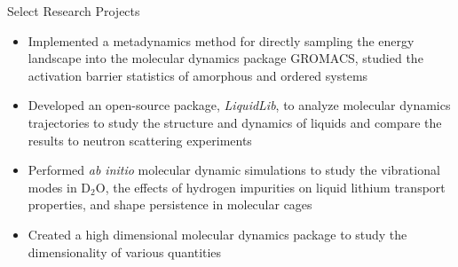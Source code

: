 \documentclass[9pt]{resume} %
\begin{document}
\begin{rSection}{Select Research Projects}
	\begin{itemize}\setlength\itemsep{-3pt}
		\item Implemented a metadynamics method for directly sampling the energy landscape into the molecular dynamics package GROMACS, studied the activation barrier statistics of amorphous and ordered systems
		\item Developed an open-source package, \textit{LiquidLib}, to analyze molecular dynamics trajectories to study the structure and dynamics of liquids and compare the results to neutron scattering experiments 
		\item Performed \textit{ab initio} molecular dynamic simulations to study the vibrational modes in D$_2$O, the effects of hydrogen impurities on liquid lithium transport properties, and shape persistence in molecular cages 
		\item Created a high dimensional molecular dynamics package to study the dimensionality of various quantities
	\end{itemize}

\end{rSection}
\end{document}
